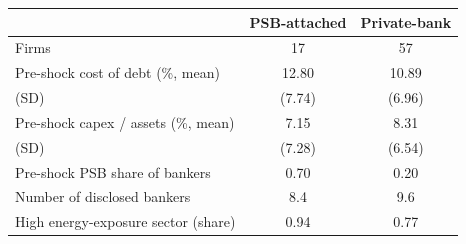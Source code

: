 \begin{tabular}{lcc}
\toprule
 & PSB-attached & Private-bank \\
\midrule
Firms & 17 & 57 \\
Pre-shock cost of debt (\%, mean) & 12.80 & 10.89 \\
\quad (SD) & (7.74) & (6.96) \\
Pre-shock capex / assets (\%, mean) & 7.15 & 8.31 \\
\quad (SD) & (7.28) & (6.54) \\
Pre-shock PSB share of bankers & 0.70 & 0.20 \\
Number of disclosed bankers & 8.4 & 9.6 \\
High energy-exposure sector (share) & 0.94 & 0.77 \\
\bottomrule
\end{tabular}